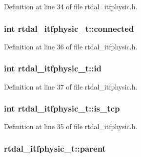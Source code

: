 Definition at line 34 of file rtdal\-\_\-itfphysic.\-h.

\hypertarget{structrtdal__itfphysic__t_a08ddbccdcb13151090301cc74c26c7f6}{
\subsubsection[{connected}]{\setlength{\rightskip}{0pt plus 5cm}int rtdal\-\_\-itfphysic\-\_\-t\-::connected}}\label{structrtdal__itfphysic__t_a08ddbccdcb13151090301cc74c26c7f6}


Definition at line 36 of file rtdal\-\_\-itfphysic.\-h.

\hypertarget{structrtdal__itfphysic__t_a970c448897d32b96adb1eba461dda7f6}{
\subsubsection[{id}]{\setlength{\rightskip}{0pt plus 5cm}int rtdal\-\_\-itfphysic\-\_\-t\-::id}}\label{structrtdal__itfphysic__t_a970c448897d32b96adb1eba461dda7f6}


Definition at line 37 of file rtdal\-\_\-itfphysic.\-h.

\hypertarget{structrtdal__itfphysic__t_a515a63500d305554230d7c9abde3d03f}{
\subsubsection[{is\-\_\-tcp}]{\setlength{\rightskip}{0pt plus 5cm}int rtdal\-\_\-itfphysic\-\_\-t\-::is\-\_\-tcp}}\label{structrtdal__itfphysic__t_a515a63500d305554230d7c9abde3d03f}


Definition at line 35 of file rtdal\-\_\-itfphysic.\-h.

\hypertarget{structrtdal__itfphysic__t_a070c6f1daf71d41c5871fdb4bd81c124}{
\subsubsection[{parent}]{ rtdal\-\_\-itfphysic\-\_\-t\-::parent}}\label{structrtdal__itfphysic__t_a070c6f1daf71d41c5871fdb4bd81c124}


